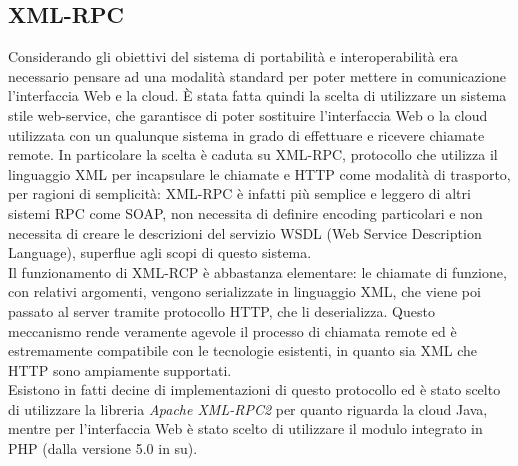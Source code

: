 \subsection{XML-RPC}
Considerando gli obiettivi del sistema di portabilità e interoperabilità era necessario pensare ad una modalità standard per poter mettere in comunicazione l'interfaccia Web e la cloud. È stata fatta quindi la scelta di utilizzare un sistema stile web-service, che garantisce di poter sostituire l'interfaccia Web o la cloud utilizzata con un qualunque sistema in grado di effettuare e ricevere chiamate remote. In particolare la scelta è caduta su XML-RPC, protocollo che utilizza il linguaggio XML per incapsulare le chiamate e HTTP come modalità di trasporto, per ragioni di semplicità: XML-RPC è infatti più semplice e leggero di altri sistemi RPC come SOAP, non necessita di definire encoding particolari e non necessita di creare le descrizioni del servizio WSDL (Web Service Description Language), superflue agli scopi di questo sistema.
\\Il funzionamento di XML-RCP è abbastanza elementare: le chiamate di funzione, con relativi argomenti, vengono serializzate in linguaggio XML, che viene poi passato al server tramite protocollo HTTP, che li deserializza. Questo meccanismo rende veramente agevole il processo di chiamata remote ed è estremamente compatibile con le tecnologie esistenti, in quanto sia XML che HTTP sono ampiamente supportati.
\\Esistono in fatti decine di implementazioni di questo protocollo ed è stato scelto di utilizzare la libreria \textit{Apache XML-RPC2} per quanto riguarda la cloud Java, mentre per l'interfaccia Web è stato scelto di utilizzare il modulo integrato in PHP (dalla versione 5.0 in su).

